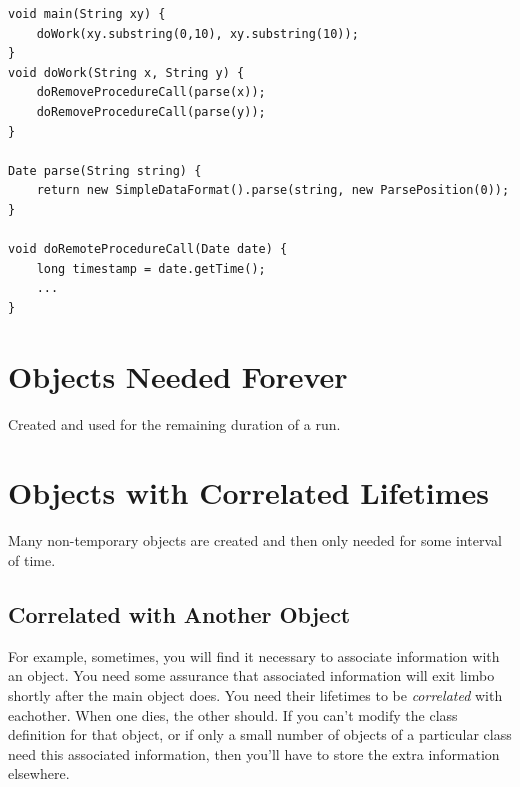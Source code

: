 \begin{lstlisting}[float,caption=Code that constructs 8 temporary objects to handle two dates.,label=TempExampleCode]
void main(String xy) {
	doWork(xy.substring(0,10), xy.substring(10));
}	
void doWork(String x, String y) {
	doRemoveProcedureCall(parse(x));
	doRemoveProcedureCall(parse(y));
}
	
Date parse(String string) {
	return new SimpleDataFormat().parse(string, new ParsePosition(0));
}

void doRemoteProcedureCall(Date date) {
	long timestamp = date.getTime();
	...
}
\end{lstlisting}







\section{Objects Needed Forever}
\label{forever-lifetime}

Created and used for the remaining duration of a run.


\section{Objects with Correlated Lifetimes}

Many non-temporary objects are created and then only needed for some interval of
time.

\subsection{Correlated with Another Object}
\label{correlated-lifetime-1}


For example, sometimes, you will find it necessary to associate information with
an object. You need some assurance that associated information will exit limbo
shortly after the main object does. You need their lifetimes to be {\em
correlated} with eachother. When one dies, the other should. If you can't modify
the class definition for that object, or if only a small number of objects of a
particular class need this associated information, then you'll have to store the
extra information elsewhere.

